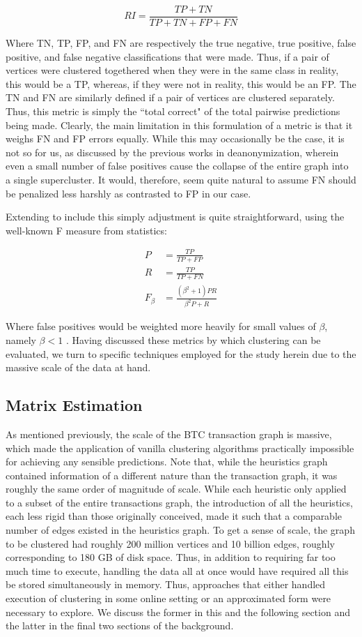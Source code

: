 \documentclass{article}
\begin{document}
$$ RI = \frac{TP + TN}{TP + TN + FP + FN} $$

Where TN, TP, FP, and FN are respectively the true negative, true positive, false positive, and false negative classifications that were made. Thus, if a pair of vertices were clustered togethered when they were in the same class in reality, this would be a TP, whereas, if they were not in reality, this would be an FP. The TN and FN are similarly defined if a pair of vertices are clustered separately. Thus, this metric is simply the ``total correct" of the total pairwise predictions being made. Clearly, the main limitation in this formulation of a metric is that it weighs FN and FP errors equally. While this may occasionally be the case, it is not so for us, as discussed by the previous works in deanonymization, wherein even a small number of false positives cause the collapse of the entire graph into a single supercluster. It would, therefore, seem quite natural to assume FN should be penalized less harshly as contrasted to FP in our case.

Extending to include this simply adjustment is quite straightforward, using the well-known F measure from statistics:

\begin{align}
P &= \frac{TP}{TP+FP} \\
R &= \frac{TP}{TP+FN} \\
F_{\beta} &= \frac{(\beta^2+1)PR}{\beta^2 P+R}
\end{align}

Where false positives would be weighted more heavily for small values of $\beta$, namely $\beta<1$ \cite{evaluation}. Having discussed these metrics by which clustering can be evaluated, we turn to specific techniques employed for the study herein due to the massive scale of the data at hand.

\subsection{Matrix Estimation}
As mentioned previously, the scale of the BTC transaction graph is massive, which made the application of vanilla clustering algorithms practically impossible for achieving any sensible predictions. Note that, while the heuristics graph contained information of a different nature than the transaction graph, it was roughly the same order of magnitude of scale. While each heuristic only applied to a subset of the entire transactions graph, the introduction of all the heuristics, each less rigid than those originally conceived, made it such that a comparable number of edges existed in the heuristics graph. To get a sense of scale, the graph to be clustered had roughly 200 million vertices and 10 billion edges, roughly corresponding to 180 GB of disk space. Thus, in addition to requiring far too much time to execute, handling the data all at once would have required all this be stored simultaneously in memory. Thus, approaches that either handled execution of clustering in some online setting or an approximated form were necessary to explore. We discuss the former in this and the following section and the latter in the final two sections of the background.
\end{document}
